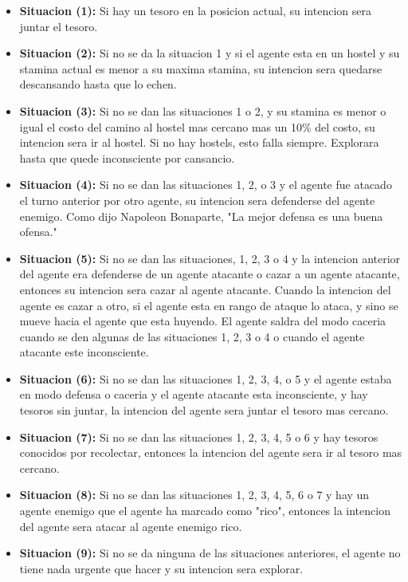 \documentclass[a4paper,12pt]{report}
\begin{document}
\begin{itemize}
\item \textbf{Situacion (1):} 
Si hay un tesoro en la posicion actual, su intencion sera juntar el tesoro.

\item \textbf{Situacion (2):} 
Si no se da la situacion 1 y si el agente esta en un hostel y su stamina actual es menor a su 
maxima stamina, su intencion sera quedarse descansando hasta que lo echen.

\item \textbf{Situacion (3):} 
Si no se dan las situaciones 1 o 2, y su stamina es menor o igual el costo del camino al hostel 
mas cercano mas un 10\% del costo, su intencion sera ir al hostel.
Si no hay hostels, esto falla siempre. Explorara hasta que quede inconsciente por cansancio.

\item \textbf{Situacion (4):}
Si no se dan las situaciones 1, 2, o 3 y el agente fue atacado el turno anterior por otro agente,
su intencion sera defenderse del agente enemigo.
Como dijo Napoleon Bonaparte, "La mejor defensa es una buena ofensa."

\item \textbf{Situacion (5):}
Si no se dan las situaciones, 1, 2, 3 o 4 y la intencion anterior del agente era defenderse de un
agente atacante o cazar a un agente atacante, entonces su intencion sera cazar al agente atacante.
Cuando la intencion del agente es cazar a otro, si el agente esta en rango de ataque lo ataca, 
y sino se mueve hacia el agente que esta huyendo.
El agente saldra del modo caceria cuando se den algunas de las situaciones 1, 2, 3 o 4 o cuando 
el agente atacante este inconsciente. 

\item \textbf{Situacion (6):}
Si no se dan las situaciones 1, 2, 3, 4, o 5 y el agente estaba en modo defensa o caceria y el 
agente atacante esta inconsciente, y hay tesoros sin juntar, la intencion del agente sera juntar 
el tesoro mas cercano. 

\item \textbf{Situacion (7):}
Si no se dan las situaciones 1, 2, 3, 4, 5 o 6 y hay tesoros conocidos por recolectar, 
entonces la intencion del agente sera ir al tesoro mas cercano. 

\item \textbf{Situacion (8): }
Si no se dan las situaciones 1, 2, 3, 4, 5, 6 o 7 y hay un agente enemigo que el agente ha
marcado como "rico", entonces la intencion del agente sera atacar al agente enemigo rico.

\item \textbf{Situacion (9):}
Si no se da ninguna de las situaciones anteriores, el agente no tiene nada urgente que hacer
y su intencion sera explorar.
\end{itemize}
\end{document}
